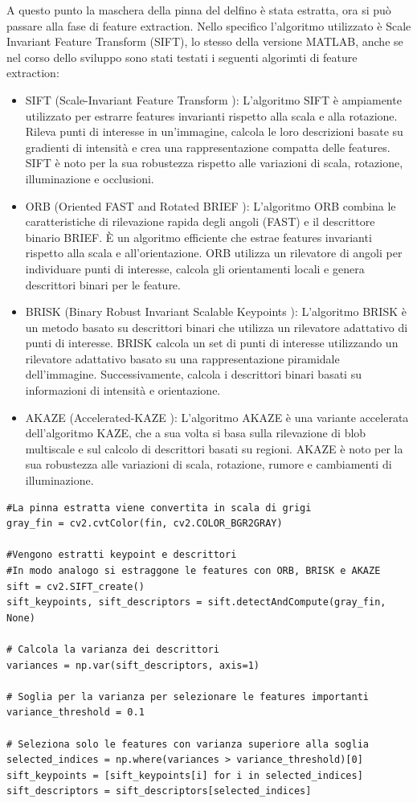 \documentclass[a4paper,12pt]{report}
\begin{document}
    A questo punto la maschera della pinna del delfino è stata estratta, 
    ora si può passare alla fase di feature extraction. Nello specifico l'algoritmo utilizzato 
    è Scale Invariant Feature Transform (SIFT), lo stesso della versione MATLAB,
    anche se nel corso dello sviluppo sono stati testati i seguenti algorimti di feature extraction:
    \begin{itemize}
      \item SIFT (Scale-Invariant Feature Transform \cite{lowe2004distinctive}): L'algoritmo SIFT è ampiamente utilizzato per estrarre features invarianti rispetto alla scala e alla rotazione. Rileva punti di interesse in un'immagine, calcola le loro descrizioni basate su gradienti di intensità e crea una rappresentazione compatta delle features. SIFT è noto per la sua robustezza rispetto alle variazioni di scala, rotazione, illuminazione e occlusioni.
      \item ORB (Oriented FAST and Rotated BRIEF \cite{rublee2011orb}): L'algoritmo ORB combina le caratteristiche di rilevazione rapida degli angoli (FAST) e il descrittore binario BRIEF. È un algoritmo efficiente che estrae features invarianti rispetto alla scala e all'orientazione. ORB utilizza un rilevatore di angoli per individuare punti di interesse, calcola gli orientamenti locali e genera descrittori binari per le feature.
      \newpage
      \item BRISK (Binary Robust Invariant Scalable Keypoints \cite{leutenegger2011brisk}): L'algoritmo BRISK è un metodo basato su descrittori binari che utilizza un rilevatore adattativo di punti di interesse. BRISK calcola un set di punti di interesse utilizzando un rilevatore adattativo basato su una rappresentazione piramidale dell'immagine. Successivamente, calcola i descrittori binari basati su informazioni di intensità e orientazione.
      \item AKAZE (Accelerated-KAZE \cite{alcantarilla2012fast}): L'algoritmo AKAZE è una variante accelerata dell'algoritmo KAZE, che a sua volta si basa sulla rilevazione di blob multiscale e sul calcolo di descrittori basati su regioni. AKAZE è noto per la sua robustezza alle variazioni di scala, rotazione, rumore e cambiamenti di illuminazione.
    \end{itemize}
\begin{lstlisting}
#La pinna estratta viene convertita in scala di grigi
gray_fin = cv2.cvtColor(fin, cv2.COLOR_BGR2GRAY)

#Vengono estratti keypoint e descrittori
#In modo analogo si estraggone le features con ORB, BRISK e AKAZE
sift = cv2.SIFT_create()
sift_keypoints, sift_descriptors = sift.detectAndCompute(gray_fin, None)

# Calcola la varianza dei descrittori
variances = np.var(sift_descriptors, axis=1)

# Soglia per la varianza per selezionare le features importanti
variance_threshold = 0.1

# Seleziona solo le features con varianza superiore alla soglia
selected_indices = np.where(variances > variance_threshold)[0]
sift_keypoints = [sift_keypoints[i] for i in selected_indices]
sift_descriptors = sift_descriptors[selected_indices]
\end{lstlisting}
\end{document}
